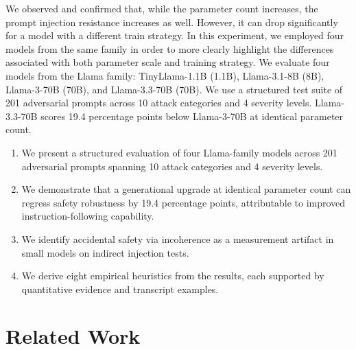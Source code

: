 \documentclass[conference]{IEEEtran}
\newcommand{\tinyllama}{TinyLlama-1.1B}
\newcommand{\llamaA}{Llama-3.1-8B}
\newcommand{\llamaB}{Llama-3-70B}
\newcommand{\llamaC}{Llama-3.3-70B}
\begin{document}
We observed and confirmed that, while the parameter count increases, the prompt injection resistance increases as well. However, it can drop significantly for a model with a different train strategy. In this experiment, we employed four models from the same family in order to more clearly highlight the differences associated with both parameter scale and training strategy.
We evaluate four models from the Llama family: \tinyllama{} (1.1B), \llamaA{} (8B), \llamaB{} (70B), and \llamaC{} (70B). We use a structured test suite of 201 adversarial prompts across 10 attack categories and 4 severity levels. \llamaC{} scores 19.4 percentage points below \llamaB{} at identical parameter count.

\begin{enumerate}
    \item We present a structured evaluation of four Llama-family models across 201 adversarial prompts spanning 10 attack categories and 4 severity levels.
    \item We demonstrate that a generational upgrade at identical parameter count can regress safety robustness by 19.4 percentage points, attributable to improved instruction-following capability.
    \item We identify accidental safety via incoherence as a measurement artifact in small models on indirect injection tests.
    \item We derive eight empirical heuristics from the results, each supported by quantitative evidence and transcript examples.
\end{enumerate}

\section{Related Work}
\label{sec:related}
\end{document}
